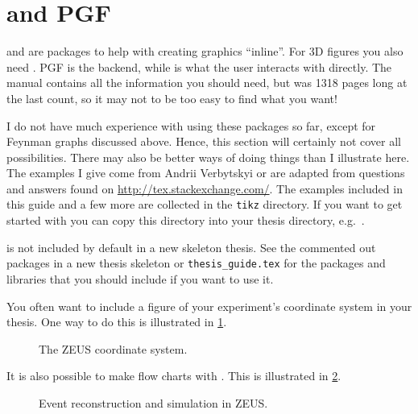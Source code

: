 \section{\TikZ and PGF}%
\label{sec:fig:tikz}

 and \Package{\TikZ} are packages to help with
creating graphics \enquote{inline}.
For 3D figures you also need .
PGF is the backend, while \TikZ is what the user interacts with directly.
The manual contains all the information you should need,
but was 1318 pages long at the last count,
so it may not to be too easy to find what you want!

I do not have much experience with using these packages so far,
except for Feynman graphs discussed above.
Hence, this section will certainly not cover all possibilities. There may
also be better ways of doing things than I illustrate here. The
examples I give come from Andrii Verbytskyi or are adapted from
questions and answers found on
\url{http://tex.stackexchange.com/}.
The examples included in this
guide and a few more are collected in the \texttt{tikz} directory.
If you want to get started with \TikZ you can copy this directory
into your thesis directory, e.g.\ .

\TikZ is not included by default in a new skeleton thesis.
See the commented out packages in a new thesis skeleton or
\texttt{thesis\_guide.tex} for the packages and \TikZ libraries that
you should include if you want to use it.

You often want to include a figure of your experiment's coordinate
system in your thesis. One way to do this is illustrated in
\cref{fig:tikz:coord}.

\begin{figure}[htbp]
\begin{tcblisting}{}
\centering

\caption{The ZEUS coordinate system.}%
\label{fig:tikz:coord}
\end{tcblisting}
\end{figure}

It is also possible to make flow charts with \TikZ.
This is illustrated in \cref{fig:tikz:flow}.

\begin{figure}[htbp]
\begin{tcblisting}{}
\centering

\caption[Event reconstruction and simulation in ZEUS]{Event reconstruction and simulation in ZEUS.}%
\label{fig:tikz:flow}
\end{tcblisting}
\end{figure}

